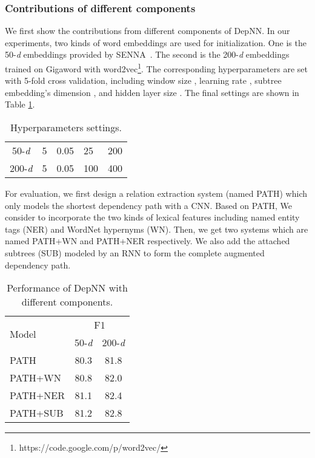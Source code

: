 \documentclass[11pt]{article}
\begin{document}
\subsubsection{Contributions of different components}
We first show the contributions from different components of DepNN.
In our experiments, two kinds of word embeddings  are used for initialization. One is the 50-\textit{d} embeddings provided by SENNA~\cite{collobert2011natural}.
The second is the 200-\textit{d} embeddings~\cite{MoYu2014qv} trained on Gigaword with word2vec\footnote{https://code.google.com/p/word2vec/}.
The corresponding hyperparameters are set with 5-fold cross validation, including window size , learning rate , subtree embedding's dimension , and hidden layer size . The final settings are shown in Table \ref{tab:hyp}.
\begin{table}[htbp]
\center
\begin{tabular}{|c|p{0.8cm}<{\centering}|p{0.8cm}<{\centering}|p{0.8cm}<{\centering}|p{0.8cm}<{\centering}|}
\hline
&&&&\\
\hline
50-\textit{d}&5&0.05&25&200\\

200-\textit{d}&5&0.05&100&400\\
\hline
 \end{tabular}
 \caption{Hyperparameters settings.}\label{tab:hyp}
\end{table}

For evaluation, we first design a relation extraction system (named PATH) which only models the shortest dependency path with a CNN.
Based on PATH, We consider to incorporate the two kinds of lexical features including named entity tags (NER) and WordNet hypernyms (WN).
Then, we get two systems which are named PATH+WN and PATH+NER respectively.
We also add the attached subtrees (SUB) modeled by an RNN to form the complete augmented dependency path.

\begin{table}[!htbp]
	\center
	\begin{tabular}{|l|cc|}
		\hline
		\multirow{2}{*}{Model}&
		\multicolumn{2}{c|}{F1}\\
		\cline{2-3}
		& 50-\textit{d} & 200-\textit{d}\\
		\hline
		PATH&80.3&81.8\\
        PATH+WN&80.8&82.0\\
        PATH+NER&81.1&82.4\\
		PATH+SUB&81.2&82.8\\
		\hline
	\end{tabular}
	\caption{Performance of DepNN with different components.}\label{tab:feature sets}

\end{table}
\end{document}
